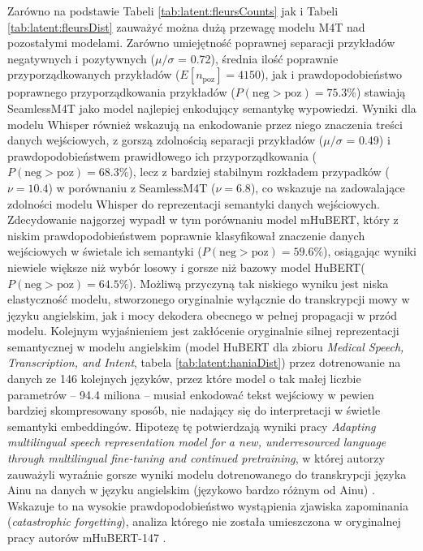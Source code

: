 Zarówno na podstawie Tabeli \ref{tab:latent:fleursCounts} jak i Tabeli \ref{tab:latent:fleursDist} zauważyć można dużą przewagę modelu M4T nad pozostałymi modelami. Zarówno umiejętność poprawnej separacji przykładów negatywnych i pozytywnych ($\mu/\sigma$ = 0.72), średnia ilość poprawnie przyporządkowanych przykładów ($E[n_\text{poz}] = 4150$), jak i prawdopodobieństwo poprawnego przyporządkowania przykładów ($P(\text{neg} > \text{poz}) = 75.3\%$) stawiają SeamlessM4T jako model najlepiej enkodujący semantykę wypowiedzi. Wyniki dla modelu Whisper również wskazują na enkodowanie przez niego znaczenia treści danych wejściowych, z gorszą zdolnością separacji przykładów ($\mu/\sigma$ = 0.49) i prawdopodobieństwem prawidłowego ich przyporządkowania ($P(\text{neg} > \text{poz}) = 68.3\%$), lecz z bardziej stabilnym rozkładem przypadków ($\nu = 10.4$) w porównaniu z SeamlessM4T ($\nu = 6.8$), co wskazuje na zadowalające zdolności modelu Whisper do reprezentacji semantyki danych wejściowych. Zdecydowanie najgorzej wypadł w tym porównaniu model mHuBERT, który z niskim prawdopodobieństwem poprawnie klasyfikował znaczenie danych wejściowych w świetale ich semantyki ($P(\text{neg} > \text{poz}) = 59.6\%$), osiągając wyniki niewiele większe niż wybór losowy i gorsze niż bazowy model HuBERT($P(\text{neg} > \text{poz}) = 64.5\%$). Możliwą przyczyną tak niskiego wyniku jest niska elastyczność modelu, stworzonego oryginalnie wyłącznie do transkrypcji mowy w języku angielskim, jak i mocy dekodera obecnego w pełnej propagacji w przód modelu. Kolejnym wyjaśnieniem jest zakłócenie oryginalnie silnej reprezentacji semantycznej w modelu angielskim (model HuBERT dla zbioru \textit{Medical Speech, Transcription, and Intent}, tabela \ref{tab:latent:haniaDist}) przez dotrenowanie na danych ze 146 kolejnych języków, przez które model o tak małej liczbie parametrów -- 94.4 miliona -- musiał enkodować tekst wejściowy w pewien bardziej skompresowany sposób, nie nadający się do interpretacji w świetle semantyki embeddingów. Hipotezę tę potwierdzają wyniki pracy \textit{Adapting multilingual speech representation model for a new, underresourced language through multilingual fine-tuning and continued pretraining}, w której autorzy zauważyli wyraźnie gorsze wyniki modelu dotrenowanego do transkrypcji języka Ainu na danych w języku angielskim (językowo bardzo różnym od Ainu) \cite{latentBreakMultilingual}. Wskazuje to na wysokie prawdopodobieństwo wystąpienia zjawiska zapominania (\textit{catastrophic forgetting}), analiza którego nie została umieszczona w oryginalnej pracy autorów mHuBERT-147 \cite{mhubert}.

